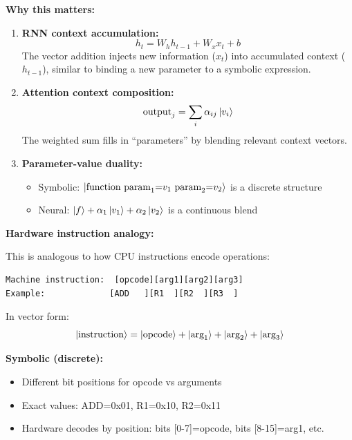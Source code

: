 \documentclass[11pt,a4paper]{article}
\theoremstyle{definition}
\begin{document}
\textbf{Why this matters:}

\begin{enumerate}
\item \textbf{RNN context accumulation:}
\begin{equation}
h_t = W_h h_{t-1} + W_x x_t + b
\end{equation}
The vector addition injects new information ($x_t$) into accumulated context ($h_{t-1}$), similar to binding a new parameter to a symbolic expression.

\item \textbf{Attention context composition:}
\begin{equation}
\text{output}_j = \sum_i \alpha_{ij} \ket{v_i}
\end{equation}
The weighted sum fills in ``parameters'' by blending relevant context vectors.

\item \textbf{Parameter-value duality:}
\begin{itemize}
\item Symbolic: $\ket{\text{function param}_1\text{=}v_1 \text{ param}_2\text{=}v_2}$ is a discrete structure
\item Neural: $\ket{f} + \alpha_1 \ket{v_1} + \alpha_2 \ket{v_2}$ is a continuous blend
\end{itemize}
\end{enumerate}

\textbf{Hardware instruction analogy:}

This is analogous to how CPU instructions encode operations:

\begin{lstlisting}
Machine instruction:  [opcode][arg1][arg2][arg3]
Example:             [ADD   ][R1  ][R2  ][R3  ]
\end{lstlisting}

In vector form:
\begin{equation}
\ket{\text{instruction}} = \ket{\text{opcode}} + \ket{\text{arg}_1} + \ket{\text{arg}_2} + \ket{\text{arg}_3}
\end{equation}

\textbf{Symbolic (discrete):}
\begin{itemize}
\item Different bit positions for opcode vs arguments
\item Exact values: ADD=0x01, R1=0x10, R2=0x11
\item Hardware decodes by position: bits [0-7]=opcode, bits [8-15]=arg1, etc.
\end{itemize}
\end{document}
